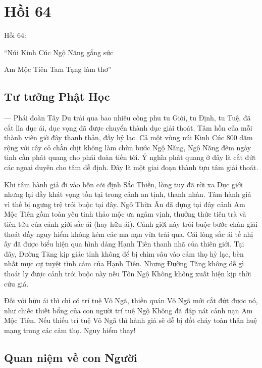 \chapter{Hồi 64} %
\label{cha:hoi_64}

Hồi 64:

\begin{itshape}
``Núi Kinh Cúc Ngộ Năng gắng sức

Am Mộc Tiên Tam Tạng làm thơ''
\end{itshape}

\section{Tư tưởng Phật Học} %
\label{sec:64_phat_hoc}

— Phái đoàn Tây Du trải qua bao nhiêu công phu tu Giới, tu Định, tu Tuệ, đã cắt lìa dục ái, dục vọng đã được chuyển thành dục giải thoát. Tâm hồn của mỗi thành viên giờ đây thanh thản, đầy hỷ lạc. Cả một vùng núi Kinh Cúc 800 dặm rộng với cây cỏ chằn chịt không làm chùn bước Ngộ Năng, Ngộ Năng đêm ngày tinh cần phát quang cho phái đoàn tiến tới. Ý nghĩa phát quang ở đây là cắt đứt các ngoại duyên cho tâm dễ định. Đây là một giai đoạn thành tựu tâm giải thoát.

Khi tâm hành giả đi vào bốn cõi định Sắc Thiền, lòng tuy đã rời xa Dục giới nhưng lại đầy khát vọng tồn tại trong cảnh an tịnh, thanh nhàn. Tâm hành giả vì thế bị ngưng trệ trói buộc tại đây. Ngô Thừa Ân đã dựng tại đây cảnh Am Mộc Tiên gồm toàn yêu tinh thảo mộc ưa ngâm vịnh, thưởng thức tiên trà và tiên tửu của cảnh giới sắc ái (hay hữu ái). Cảnh giới này trói buộc bước chân giải thoát đầy nguy hiểm không kém các ma nạn vừa trải qua. Cái lòng sắc ái tế nhị ấy đã được biểu hiện qua hình dáng Hạnh Tiên thanh nhã của thiên giới. Tại đây, Đường Tăng kịp giác tỉnh không để bị chìm sâu vào cảm thọ hỷ lạc, bèn nhất mực cự tuyệt tình cảm của Hạnh Tiên. Nhưng Đường Tăng không dễ gì thoát ly được cảnh trói buộc này nếu Tôn Ngộ Không không xuất hiện kịp thời cứu giá.

Đối với hữu ái thì chỉ có trí tuệ Vô Ngã, thiền quán Vô Ngã mới cắt đứt được nó, như chiếc thiết bổng của con người trí tuệ Ngộ Không đã đập nát cảnh nạn Am Mộc Tiên. Nếu thiếu trí tuệ Vô Ngã thì hành giả sẽ dễ bị đốt cháy toàn thân huệ mạng trong các cảm thọ. Nguy hiểm thay!

\section{Quan niệm về con Người} %
\label{sec:64_con_nguoi}

